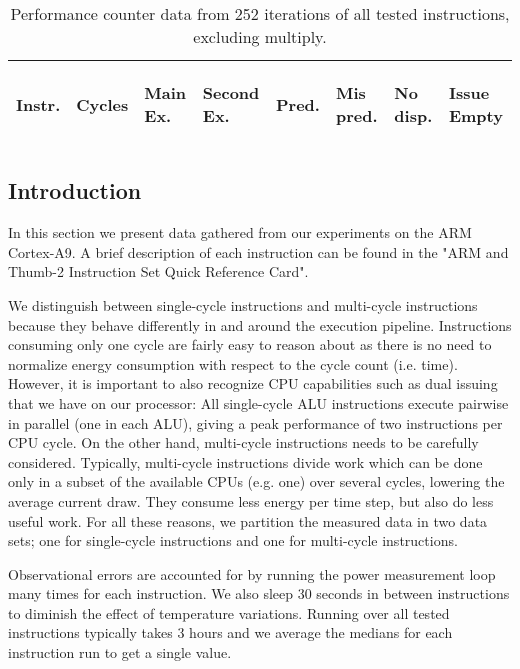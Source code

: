 \begin{table}
    \centering
    \begin{tabular}{|p{0.7cm}|R{0.8cm}R{0.6cm}R{0.9cm}R{0.6cm}R{0.6cm}R{0.8cm}R{0.8cm}|}
        \hline
        \centering
        Instr. &
        \centering
        Cycles &
        \centering
        Main Ex. &
        \centering
        Second Ex. &
        \centering
        Pred. &
        \centering
        Mis pred. &
        \centering
        No disp. &
        \begin{centering}
        Issue Empty
        \end{centering}
        \\
        \hline
        
        \hline
    \end{tabular}
    \caption{Performance counter data from 252 iterations of all tested
    instructions, excluding multiply.}
    \label{tab:perf_nonmul}
\end{table}

\subsection{Introduction}
In this section we present data gathered from our experiments on the ARM
Cortex-A9. A brief description of each instruction can be found in the "ARM and
Thumb-2 Instruction Set Quick Reference Card"\cite{armasmref}.

We distinguish between single-cycle instructions and multi-cycle instructions
because they behave differently in and around the execution pipeline.
Instructions consuming only one cycle are fairly easy to reason about as there
is no need to normalize energy consumption with respect to the cycle count (i.e.
time). However, it is important to also recognize CPU capabilities such as dual
issuing that we have on our processor: All single-cycle ALU instructions execute
pairwise in parallel (one in each ALU), giving a peak performance of two
instructions per CPU cycle. On the other hand, multi-cycle instructions needs to
be carefully considered. Typically, multi-cycle instructions divide work which
can be done only in a subset of the available CPUs (e.g. one) over several
cycles, lowering the average current draw. They consume less energy per time
step, but also do less useful work. For all these reasons, we partition the
measured data in two data sets; one for single-cycle instructions and one for
multi-cycle instructions.

Observational errors are accounted for by running the power measurement loop
many times for each instruction. We also sleep 30 seconds in between
instructions to diminish the effect of temperature variations. Running over all
tested instructions typically takes 3 hours and we average the medians for each
instruction run to get a single value.

